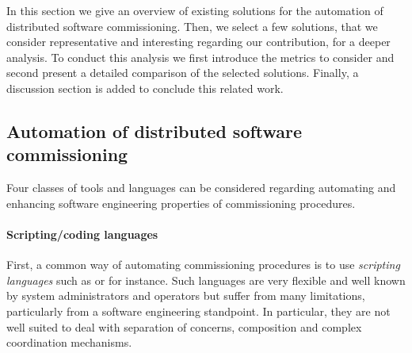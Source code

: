 


In this section we give an overview of existing solutions for the automation of distributed software commissioning. Then, we select a few solutions, that we consider representative and interesting regarding our contribution, for a deeper analysis. To conduct this analysis we first introduce the metrics to consider and second present a detailed comparison of the selected solutions. Finally, a discussion section is added to conclude this related work.

\subsection{Automation of distributed software commissioning}
\label{sec:rwclasses}

Four classes of tools and languages can be considered regarding automating and enhancing software engineering properties of commissioning procedures.

\paragraph{Scripting/coding languages}
First, a common way of automating commissioning procedures is to use
\emph{scripting languages} such as \shell or \ruby for instance. Such
languages are very flexible and well known by system administrators
and operators but suffer from many limitations, particularly from a
software engineering standpoint. In particular, they are not well
suited to deal with separation of concerns, composition and complex
coordination mechanisms.

